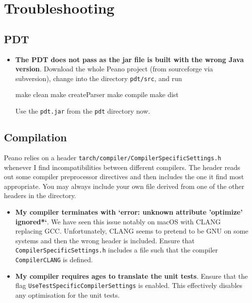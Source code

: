 \chapter{Troubleshooting}

\section{PDT}

\begin{itemize}
  \item \textbf{ The PDT does not pass as the jar file is built with the wrong
  Java version}. Download the whole Peano project (from sourceforge via subversion),
  change into the directory \texttt{pdt/src}, and run
  \begin{code}
  make clean
  make createParser
  make compile
  make dist
  \end{code}
  Use the \texttt{pdt.jar} from the \texttt{pdt} directory now. 
\end{itemize}





\section{Compilation}

Peano relies on a header \texttt{tarch/compiler/CompilerSpecificSettings.h}
whenever I find incompatibilities between different compilers. 
The header reads out some compiler preprocessor directives and then includes the
one it find most appropriate. 
You may always include your own file derived from one of the other headers in
the directory.


\begin{itemize}
  \item \textbf{ My compiler terminates with `error: unknown
   attribute 'optimize' ignored*`}. We have seen this issue notably on macOS
   with CLANG replacing GCC. Unfortunately, CLANG seems to pretend to be GNU on
   some systems and then the wrong header is included. Ensure that
   \texttt{CompilerSpecificSettings.h} includes a file such that the compiler
   \linebreak
   \texttt{CompilerCLANG} is defined.
  \item \textbf{ My compiler requires ages to translate the unit tests}. Ensure
  that the flag \linebreak \texttt{UseTestSpecificCompilerSettings} is enabled.
  This effectively disables any optimisation for the unit tests.
\end{itemize}



